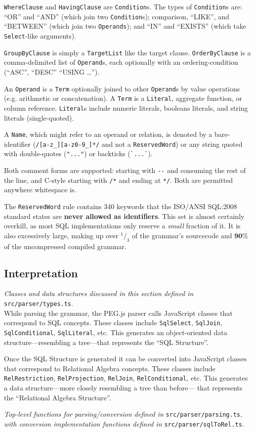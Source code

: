 \documentclass{article}
\begin{document}
\verb|WhereClause| and \verb|HavingClause| are \verb|Condition|s.
The types of \verb|Condition|s are: ``OR'' and ``AND'' (which join two
\verb|Condition|s); comparison, ``LIKE'', and ``BETWEEN'' (which join two
\verb|Operands|); and ``IN'' and ``EXISTS'' (which take \verb|Select|-like
arguments).

\verb|GroupByClause| is simply a \verb|TargetList| like the target clause.
\verb|OrderByClause| is a comma-delimited list of \verb|Operand|s, each optionally
with an ordering-condition (``ASC'', ``DESC'' ``USING \ldots'').

An \verb|Operand| is a \verb|Term| optionally joined to other \verb|Operand|s
by value operations (e.g. arithmetic or concatenation).
A \verb|Term| is a \verb|Literal|, aggregate function, or column reference.
\verb|Literal|s include numeric literals, booleans literals, and string literals
(single-quoted).

A \verb|Name|, which might refer to an operand or relation, is denoted by a
bare-identifier (\verb|/[a-z_][a-z0-9_]*/| and not a \verb|ReservedWord|) or any
string quoted with double-quotes (\verb|"..."|) or backticks (\verb|`...`|).

Both comment forms are supported: starting with \verb|--| and consuming the
rest of the line, and C-style starting with \verb|/*| and ending at \verb|*/|.
Both are permitted anywhere whitespace is.

The \verb|ReservedWord| rule contains 340 keywords that the ISO/ANSI SQL:2008
standard states are \textbf{never allowed as identifiers}. This set is almost
certainly overkill, as most SQL implementations only reserve a \emph{small}
fraction of it. It is also excessively large, making up over $^1/_3$ of the
grammar's sourcecode and $\textbf{90\%}$ of the uncompressed compiled grammar.

\subsection{Interpretation}

\emph{Classes and data structures discussed in this section defined in}
      \verb|src/parser/types.ts|. \\

While parsing the grammar, the PEG.js parser calls JavaScript classes that
correspond to SQL concepts.
These classes include \verb|SqlSelect|, \verb|SqlJoin|, \verb|SqlConditional|,
\verb|SqlLiteral|, etc.
This generates an object-oriented data structure---resembling a tree---that
represents the ``SQL Structure''.

Once the SQL Structure is generated it can be converted into JavaScript classes
that correspond to Relational Algebra concepts.
These classes include \verb|RelRestriction|, \verb|RelProjection|,
\verb|RelJoin|, \verb|RelConditional|, etc.
This generates a data structure---more closely resembling a tree than before---
that represents the ``Relational Algebra Structure''.

\emph{Top-level functions for parsing/conversion defined in} \verb|src/parser/parsing.ts|,
\emph{with conversion implementation functions defined in} \verb|src/parser/sqlToRel.ts|.
\end{document}
